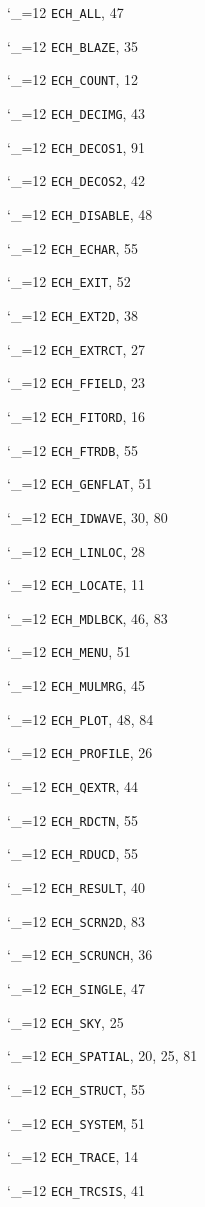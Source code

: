 \documentclass[11pt,twoside]{article}
\newcommand{\cmdname}{\begingroup \catcode`\_=12 \realcmdname}
\newcommand{\realcmdname}[1]{\endgroup\texttt{#1}}
\begin{document}
\begin{theindex}
  \item \cmdname {ECH_ALL}, 47
  \item \cmdname {ECH_BLAZE}, 35
  \item \cmdname {ECH_COUNT}, 12
  \item \cmdname {ECH_DECIMG}, 43
  \item \cmdname {ECH_DECOS1}, 91
  \item \cmdname {ECH_DECOS2}, 42
  \item \cmdname {ECH_DISABLE}, 48
  \item \cmdname {ECH_ECHAR}, 55
  \item \cmdname {ECH_EXIT}, 52
  \item \cmdname {ECH_EXT2D}, 38
  \item \cmdname {ECH_EXTRCT}, 27
  \item \cmdname {ECH_FFIELD}, 23
  \item \cmdname {ECH_FITORD}, 16
  \item \cmdname {ECH_FTRDB}, 55
  \item \cmdname {ECH_GENFLAT}, 51
  \item \cmdname {ECH_IDWAVE}, 30, 80
  \item \cmdname {ECH_LINLOC}, 28
  \item \cmdname {ECH_LOCATE}, 11
  \item \cmdname {ECH_MDLBCK}, 46, 83
  \item \cmdname {ECH_MENU}, 51
  \item \cmdname {ECH_MULMRG}, 45
  \item \cmdname {ECH_PLOT}, 48, 84
  \item \cmdname {ECH_PROFILE}, 26
  \item \cmdname {ECH_QEXTR}, 44
  \item \cmdname {ECH_RDCTN}, 55
  \item \cmdname {ECH_RDUCD}, 55
  \item \cmdname {ECH_RESULT}, 40
  \item \cmdname {ECH_SCRN2D}, 83
  \item \cmdname {ECH_SCRUNCH}, 36
  \item \cmdname {ECH_SINGLE}, 47
  \item \cmdname {ECH_SKY}, 25
  \item \cmdname {ECH_SPATIAL}, 20, 25, 81
  \item \cmdname {ECH_STRUCT}, 55
  \item \cmdname {ECH_SYSTEM}, 51
  \item \cmdname {ECH_TRACE}, 14
  \item \cmdname {ECH_TRCSIS}, 41

\end{theindex}
\end{document}
